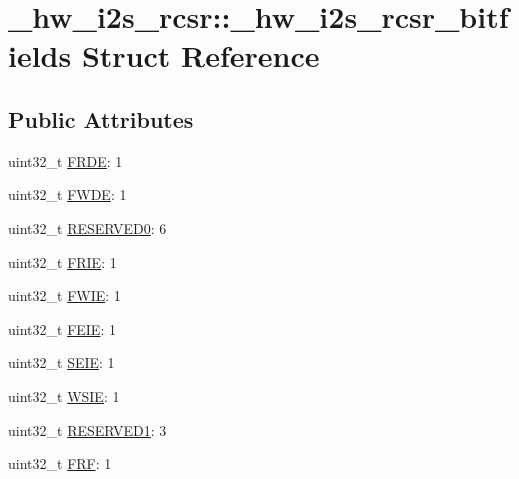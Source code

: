 \hypertarget{struct__hw__i2s__rcsr_1_1__hw__i2s__rcsr__bitfields}{}\section{\+\_\+hw\+\_\+i2s\+\_\+rcsr\+:\+:\+\_\+hw\+\_\+i2s\+\_\+rcsr\+\_\+bitfields Struct Reference}
\label{struct__hw__i2s__rcsr_1_1__hw__i2s__rcsr__bitfields}
\subsection*{Public Attributes}
\begin{DoxyCompactItemize}
\item 
uint32\+\_\+t \hyperlink{struct__hw__i2s__rcsr_1_1__hw__i2s__rcsr__bitfields_abb11340e1269733168c5c5341e2db9dc}{F\+R\+DE}\+: 1
\item 
uint32\+\_\+t \hyperlink{struct__hw__i2s__rcsr_1_1__hw__i2s__rcsr__bitfields_a64a49920204657b0c1454288ce29630d}{F\+W\+DE}\+: 1
\item 
uint32\+\_\+t \hyperlink{struct__hw__i2s__rcsr_1_1__hw__i2s__rcsr__bitfields_acc5df120a5c3ed54c75b9d6de647c728}{R\+E\+S\+E\+R\+V\+E\+D0}\+: 6
\item 
uint32\+\_\+t \hyperlink{struct__hw__i2s__rcsr_1_1__hw__i2s__rcsr__bitfields_a3a8474b12974bfbfd78557429ff50f55}{F\+R\+IE}\+: 1
\item 
uint32\+\_\+t \hyperlink{struct__hw__i2s__rcsr_1_1__hw__i2s__rcsr__bitfields_a8e6dd39e62d3637dfbcdf2f89016c918}{F\+W\+IE}\+: 1
\item 
uint32\+\_\+t \hyperlink{struct__hw__i2s__rcsr_1_1__hw__i2s__rcsr__bitfields_ad28155748790b39dd82c5a94dd6ad64b}{F\+E\+IE}\+: 1
\item 
uint32\+\_\+t \hyperlink{struct__hw__i2s__rcsr_1_1__hw__i2s__rcsr__bitfields_a13cc8982944530c194f0a06a714d4852}{S\+E\+IE}\+: 1
\item 
uint32\+\_\+t \hyperlink{struct__hw__i2s__rcsr_1_1__hw__i2s__rcsr__bitfields_a4b102eb870c693d8070976260310dbf5}{W\+S\+IE}\+: 1
\item 
uint32\+\_\+t \hyperlink{struct__hw__i2s__rcsr_1_1__hw__i2s__rcsr__bitfields_a9e7030fd6e0254b07a57e008bfacfbac}{R\+E\+S\+E\+R\+V\+E\+D1}\+: 3
\item 
uint32\+\_\+t \hyperlink{struct__hw__i2s__rcsr_1_1__hw__i2s__rcsr__bitfields_a27ed80d45d1892fb541a346f97e1ff84}{F\+RF}\+: 1
\item 

\end{DoxyCompactItemize}
